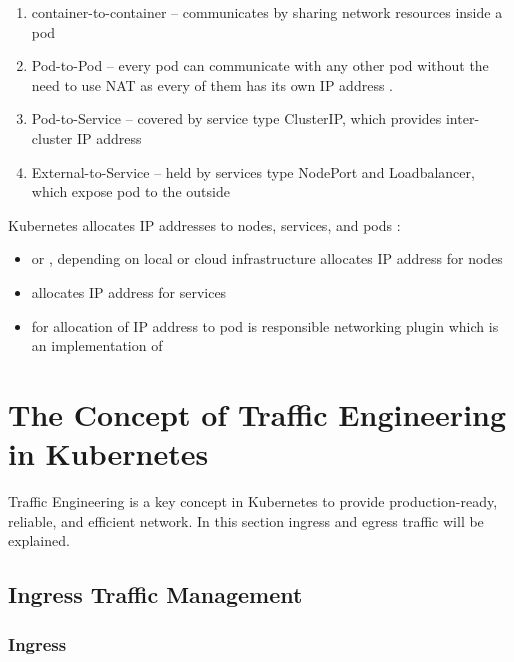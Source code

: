 \begin{enumerate}
    \item container-to-container -- communicates by sharing network resources inside a pod
    \item Pod-to-Pod -- every pod can communicate with any other pod without the need to use NAT as every of them has its own IP address \cite{IBMKubernetesNetworking}.
    \item Pod-to-Service -- covered by service type ClusterIP, which provides inter-cluster IP address
    \item External-to-Service -- held by services type NodePort and Loadbalancer, which expose pod to the outside
\end{enumerate}
Kubernetes allocates IP addresses to nodes, services, and pods \cite{KubernetesClusterNetworking}:
\begin{itemize}
    \item \textit{} or \textit{}, depending on local or cloud infrastructure allocates IP address for nodes
    \item \textit{} allocates IP address for services
    \item for allocation of IP address to pod is responsible networking plugin which is an implementation of \textit{}
\end{itemize}



\section{The Concept of Traffic Engineering in Kubernetes}
\label{sec:trafficConcept}

Traffic Engineering is a key concept in Kubernetes to provide production-ready, reliable, and efficient network. In this section ingress and egress traffic will be explained.


\subsection{Ingress Traffic Management}
\label{sec:ingressTrafficMngmnt}

\subsubsection{Ingress}
\label{ingress}

